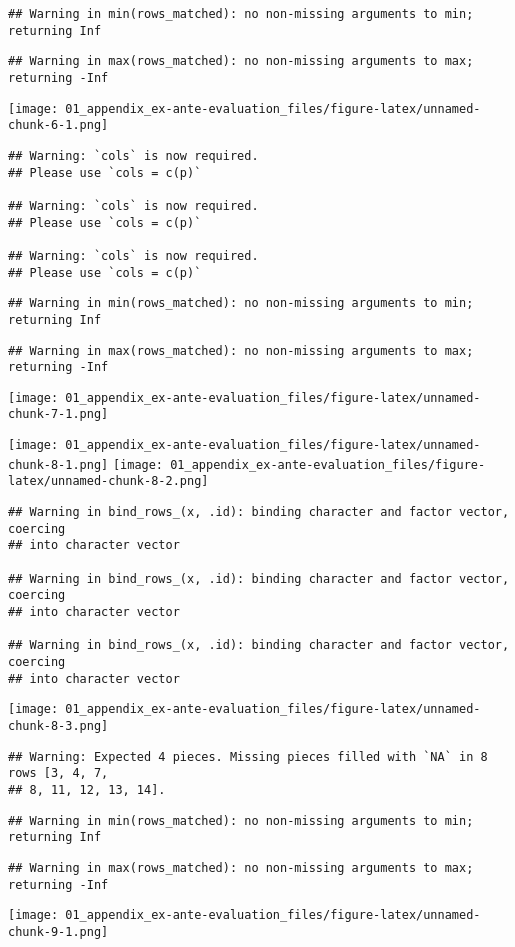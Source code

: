 \documentclass[]{article}
\begin{document}
\begin{verbatim}
## Warning in min(rows_matched): no non-missing arguments to min; returning Inf
\end{verbatim}

\begin{verbatim}
## Warning in max(rows_matched): no non-missing arguments to max; returning -Inf
\end{verbatim}

\texttt{[image: 01\_appendix\_ex-ante-evaluation\_files/figure-latex/unnamed-chunk-6-1.png]}

\begin{verbatim}
## Warning: `cols` is now required.
## Please use `cols = c(p)`

## Warning: `cols` is now required.
## Please use `cols = c(p)`

## Warning: `cols` is now required.
## Please use `cols = c(p)`
\end{verbatim}

\begin{verbatim}
## Warning in min(rows_matched): no non-missing arguments to min; returning Inf
\end{verbatim}

\begin{verbatim}
## Warning in max(rows_matched): no non-missing arguments to max; returning -Inf
\end{verbatim}

\texttt{[image: 01\_appendix\_ex-ante-evaluation\_files/figure-latex/unnamed-chunk-7-1.png]}

\texttt{[image: 01\_appendix\_ex-ante-evaluation\_files/figure-latex/unnamed-chunk-8-1.png]}
\texttt{[image: 01\_appendix\_ex-ante-evaluation\_files/figure-latex/unnamed-chunk-8-2.png]}

\begin{verbatim}
## Warning in bind_rows_(x, .id): binding character and factor vector, coercing
## into character vector

## Warning in bind_rows_(x, .id): binding character and factor vector, coercing
## into character vector

## Warning in bind_rows_(x, .id): binding character and factor vector, coercing
## into character vector
\end{verbatim}

\texttt{[image: 01\_appendix\_ex-ante-evaluation\_files/figure-latex/unnamed-chunk-8-3.png]}

\begin{verbatim}
## Warning: Expected 4 pieces. Missing pieces filled with `NA` in 8 rows [3, 4, 7,
## 8, 11, 12, 13, 14].
\end{verbatim}

\begin{verbatim}
## Warning in min(rows_matched): no non-missing arguments to min; returning Inf
\end{verbatim}

\begin{verbatim}
## Warning in max(rows_matched): no non-missing arguments to max; returning -Inf
\end{verbatim}

\texttt{[image: 01\_appendix\_ex-ante-evaluation\_files/figure-latex/unnamed-chunk-9-1.png]}
\end{document}
